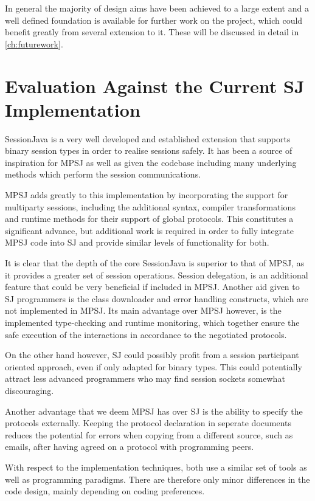 In general the majority of design aims have been achieved to a large extent and a well defined foundation is available for further work on the project, which could benefit greatly from several extension to it. These will be discussed in detail in \autoref{ch:futurework}.


\section{Evaluation Against the Current SJ Implementation}

SessionJava is a very well developed and established extension that supports binary session types in order to realise sessions safely. It has been a source of inspiration for MPSJ as well as given the codebase including many underlying methods which perform the session communications.  

MPSJ adds greatly to this implementation by incorporating the support for multiparty sessions, including the additional syntax, compiler transformations and runtime methods for their support of global protocols. This constitutes a significant advance, but additional work is required in order to fully integrate MPSJ code into SJ and provide similar levels of functionality for both.

It is clear that the depth of the core SessionJava is superior to that of MPSJ, as it provides a greater set of session operations. Session delegation, is an additional feature that could be very beneficial if included in MPSJ. Another aid given to SJ programmers is the class downloader and error handling constructs, which are not implemented in MPSJ. Its main advantage over MPSJ however, is the implemented type-checking and runtime monitoring, which together ensure the safe execution of the interactions in accordance to the negotiated protocols.

On the other hand however, SJ could possibly profit from a session participant oriented approach, even if only adapted for binary types. This could potentially attract less advanced programmers who may find session sockets somewhat discouraging.

Another advantage that we deem MPSJ has over SJ is the ability to specify the protocols externally. Keeping the protocol declaration in seperate documents reduces the potential for errors when copying from a different source, such as emails, after having agreed on a protocol with programming peers.

With respect to the implementation techniques, both use a similar set of tools as well as programming paradigms. There are therefore only minor differences in the code design, mainly depending on coding preferences. 


